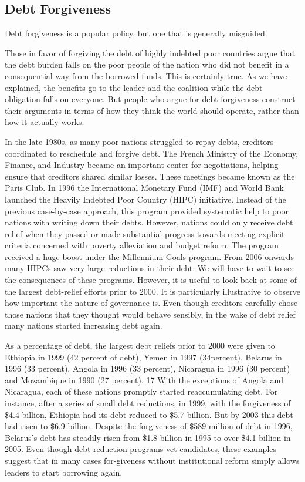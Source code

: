 \documentclass[10pt]{article}
\begin{document}
\subsection{Debt Forgiveness}

{\large Debt forgiveness is a popular policy, but one that is generally
misguided.}

{\large Those in favor of forgiving the debt of highly indebted poor countries
argue that the debt burden falls on the poor people of the nation who did not
benefit in a consequential way from the borrowed funds. This is certainly true.
As we have explained, the benefits go to the leader and the coalition while the
debt obligation falls on everyone. But people who argue for debt forgiveness
construct their arguments in terms of how they think the world should operate,
rather than how it actually works.}

{\large In the late 1980s, as many poor nations struggled to repay debts,
creditors coordinated to reschedule and forgive debt. The French Ministry of the
Economy, Finance, and Industry became an important center for negotiations,
helping ensure that creditors shared similar losses. These meetings became known
as the Paris Club. In 1996 the International Monetary Fund (IMF) and World Bank
launched the Heavily Indebted Poor Country (HIPC) initiative. Instead of the
previous case-by-case approach, this program provided systematic help to poor
nations with writing down their debts. However, nations could only receive debt
relief when they passed or made substantial progress towards meeting explicit
criteria concerned with poverty alleviation and budget reform. The program
received a huge boost under the Millennium Goals program. From 2006 onwards many
HIPCs saw very large reductions in their debt. We will have to wait to see the
consequences of these programs. However, it is useful to look back at some of the
largest debt-relief efforts prior to 2000. It is particularly illustrative to
observe how important the nature of governance is. Even though creditors
carefully chose those nations that they thought would behave sensibly, in the
wake of debt relief many nations started increasing debt again.}

{\large As a percentage of debt, the largest debt reliefs prior to 2000 were
given to Ethiopia in 1999 (42 percent of debt), Yemen in 1997 (34percent),
Belarus in 1996 (33 percent), Angola in 1996 (33 percent), Nicaragua in 1996 (30
percent) and Mozambique in 1990 (27 percent). 17 With the exceptions of Angola
and Nicaragua, each of these nations promptly started reaccumulating debt. For
instance, after a series of small debt reductions, in 1999, with the forgiveness
of \$4.4 billion, Ethiopia had its debt reduced to \$5.7 billion. But by 2003
this debt had risen to \$6.9 billion. Despite the forgiveness of \$589 million of
debt in 1996, Belarus's debt has steadily risen from \$1.8 billion in 1995 to
over \$4.1 billion in 2005. Even though debt-reduction programs vet candidates,
these examples suggest that in many cases for-giveness without institutional
reform simply allows leaders to start borrowing again.}
\end{document}
